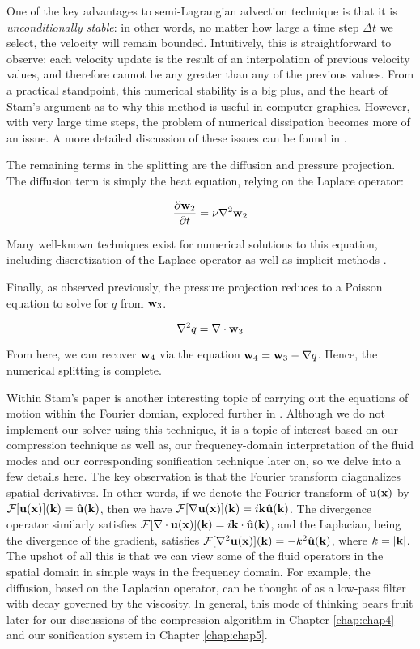One of the key advantages to semi-Lagrangian advection technique is that it is {\em unconditionally stable}: in other words, no matter how large a time step $\Delta t$ we select, the velocity will remain bounded. Intuitively, this is straightforward to observe: each velocity update is the result of an interpolation of previous velocity values, and therefore cannot be any greater than any of the previous values. From a practical standpoint, this numerical stability is a big plus, and the heart of Stam's argument as to
why this method is useful in computer graphics. However, with very large time steps, the problem of numerical dissipation becomes more of an issue. A more detailed discussion of these issues can be found in \cite{bridson2015fluid}.

The remaining terms in the splitting are the diffusion and pressure projection. The diffusion term is simply the heat equation, relying on the Laplace operator:

\begin{equation}
\frac{\partial{\mathbf{w}_2}}{\partial{t}} = \nu \nabla^2 \mathbf{w}_2
\end{equation}

Many well-known techniques exist for numerical solutions to this equation, including discretization of the Laplace operator as well as implicit methods \cite{peaceman1955numerical}.

Finally, as observed previously, the pressure projection reduces to a Poisson equation to solve for $q$ from $\mathbf{w}_3$.

\begin{equation}
\nabla^2 q = \nabla \cdot \mathbf{w}_3
\end{equation}

From here, we can recover $\mathbf{w}_4$ via the equation $\mathbf{w}_4 = \mathbf{w}_3 - \nabla q$. Hence, the numerical splitting is complete.

Within Stam's paper is another interesting topic of carrying out the equations of motion within the Fourier domian, explored further in \cite{stam2001simple}. Although 
we do not implement our solver using this technique, it is a topic of interest based on our compression technique as well as,
our frequency-domain interpretation of the fluid modes and our corresponding sonification technique later on, so we delve into a few details here. The key observation is that the Fourier transform diagonalizes spatial derivatives. In other words, if we denote the Fourier transform of $\mathbf{u}(\mathbf{x})$ by $\mathcal{F}[\mathbf{u}(\mathbf{x})](\mathbf{k}) = \hat{\mathbf{u}}(\mathbf{k})$, then we have $\mathcal{F}[\nabla \mathbf{u}(\mathbf{x})](\mathbf{k}) = i \mathbf{k} \hat{\mathbf{u}}(\mathbf{k})$. The divergence operator similarly satisfies $\mathcal{F}[\nabla \cdot \mathbf{u}(\mathbf{x})](\mathbf{k}) = i \mathbf{k} \cdot \hat{\mathbf{u}}(\mathbf{k})$, and the Laplacian, being the divergence of the gradient, satisfies $\mathcal{F}[\nabla^2 \mathbf{u}(\mathbf{x})](\mathbf{k}) = - k^2 \hat{\mathbf{u}}(\mathbf{k})$, where $k = |\mathbf{k}|$. The upshot of all this is that we can view some of the fluid operators in the spatial domain in simple ways in the frequency domain. For example, the diffusion, based on the Laplacian operator, can be thought of as a low-pass filter with decay governed by the viscosity. In general, this mode of
thinking bears fruit later for our discussions of the compression algorithm in Chapter \ref{chap:chap4} and our sonification system in Chapter \ref{chap:chap5}.

